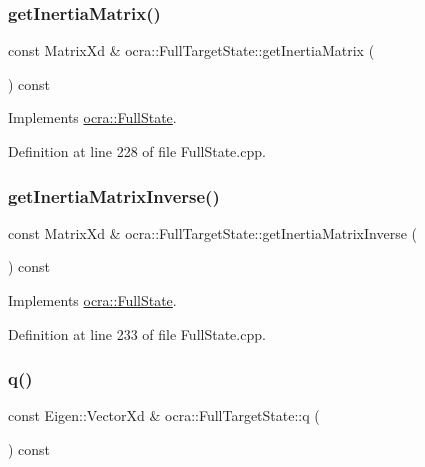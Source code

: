 \subsubsection{\texorpdfstring{get\+Inertia\+Matrix()}{getInertiaMatrix()}}
{\footnotesize\ttfamily const Matrix\+Xd \& ocra\+::\+Full\+Target\+State\+::get\+Inertia\+Matrix (\begin{DoxyParamCaption}{ }\end{DoxyParamCaption}) const\hspace{0.3cm}{\ttfamily [virtual]}}



Implements \hyperlink{classocra_1_1FullState_a5d5c2ddfaf4868f78b4621d27b500784}{ocra\+::\+Full\+State}.



Definition at line 228 of file Full\+State.\+cpp.

\hypertarget{classocra_1_1FullTargetState_a55194b2f5683696eeee538cb93f3403a}{}\label{classocra_1_1FullTargetState_a55194b2f5683696eeee538cb93f3403a} 
\subsubsection{\texorpdfstring{get\+Inertia\+Matrix\+Inverse()}{getInertiaMatrixInverse()}}
{\footnotesize\ttfamily const Matrix\+Xd \& ocra\+::\+Full\+Target\+State\+::get\+Inertia\+Matrix\+Inverse (\begin{DoxyParamCaption}{ }\end{DoxyParamCaption}) const\hspace{0.3cm}{\ttfamily [virtual]}}



Implements \hyperlink{classocra_1_1FullState_a10f3a888554035bf13b3f636ce4b4edc}{ocra\+::\+Full\+State}.



Definition at line 233 of file Full\+State.\+cpp.

\hypertarget{classocra_1_1FullTargetState_a0f246232828d53c497924b95d2b97004}{}\label{classocra_1_1FullTargetState_a0f246232828d53c497924b95d2b97004} 
\subsubsection{\texorpdfstring{q()}{q()}}
{\footnotesize\ttfamily const Eigen\+::\+Vector\+Xd \& ocra\+::\+Full\+Target\+State\+::q (\begin{DoxyParamCaption}{ }\end{DoxyParamCaption}) const\hspace{0.3cm}{\ttfamily [virtual]}}



